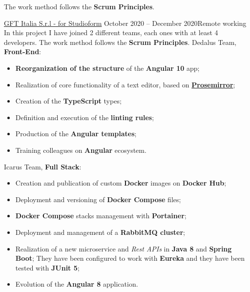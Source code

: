 \documentclass[10pt,a4paper]{altacv}
\begin{document}
The work method follows the \textbf{Scrum Principles}.
\divider

\newpage

{\marginpar{\raggedright}}
{\href{https://studioform.org/}{GFT Italia S.r.l - for Studioform}}
{October 2020 -- December 2020}{Remote working}
In this project I have joined 2 different teams, each ones with at least 4 developers.
\newline
The work method follows the \textbf{Scrum Principles}.
\newline\newline
Dedalus Team, \textbf{Front-End}:
\begin{itemize}
	\item \textbf{Reorganization of the structure} of the \textbf{Angular 10} app;
	\item Realization of core functionality of a text editor, based on \textbf{\href{https://prosemirror.net/}{Prosemirror}};
	\item Creation of the \textbf{TypeScript} types;
	\item Definition and execution of the \textbf{linting rules};
	\item Production of the \textbf{Angular templates};
	\item Training colleagues on \textbf{Angular} ecosystem.
\end{itemize}
\leavevmode \newline
Icarus Team, \textbf{Full Stack}:
\begin{itemize}
	\item Creation and publication of custom \textbf{Docker} images on \textbf{Docker Hub};
	\item Deployment and versioning of \textbf{Docker Compose} files;
	\item \textbf{Docker Compose} stacks management with \textbf{Portainer};
	\item Deployment and management of a \textbf{RabbitMQ cluster};
	\item Realization of a new microservice and \textit{Rest APIs} in \textbf{Java 8} and \textbf{Spring Boot};
	They have been configured to work with \textbf{Eureka} and they have been tested with \textbf{JUnit 5};
	\item Evolution of the \textbf{Angular 8} application.
\end{itemize}
\divider
\end{document}
